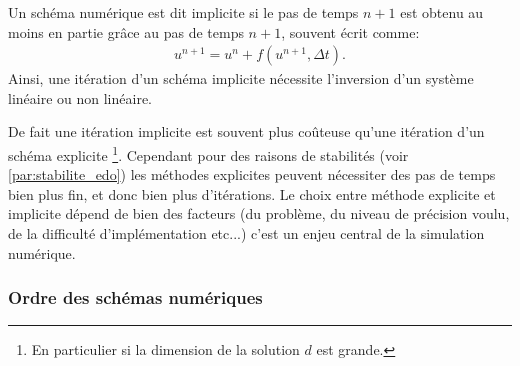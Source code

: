\begin{definition}
    Un schéma numérique est dit implicite si le pas de temps $n+1$ est obtenu au moins en partie grâce au pas de temps $n+1$, souvent écrit comme:
    \begin{align}
        u^{n+1} = u^n + f(u^{n+1} ,\Delta t ).
    \end{align}
    Ainsi, une itération d'un schéma implicite nécessite l'inversion d'un système linéaire ou non linéaire. 
\end{definition}
De fait une itération implicite est souvent plus coûteuse qu'une itération d'un schéma explicite
\footnote{En particulier si la dimension de la solution $d$ est grande.}. 
Cependant pour des raisons de stabilités (voir \ref{par:stabilite_edo}) les méthodes explicites peuvent nécessiter des pas de temps bien plus fin, et donc bien plus d'itérations.
Le choix entre méthode explicite et implicite dépend de bien des facteurs (du problème, du niveau de précision voulu, de la difficulté d'implémentation etc...)
c'est un enjeu central de la simulation numérique.
\subsubsection{Ordre des schémas numériques}

